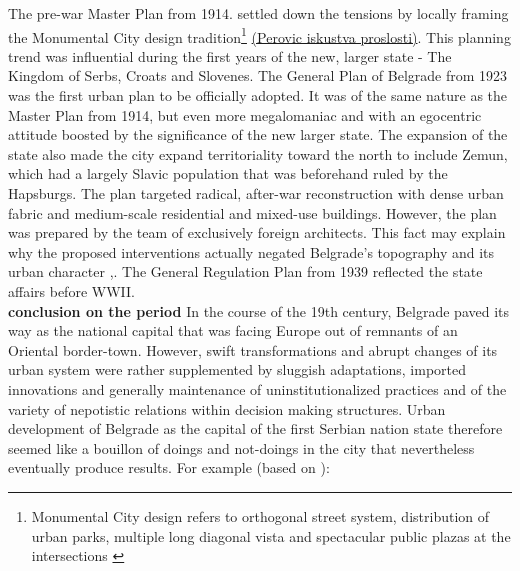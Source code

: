 \documentclass[11pt]{report}
\begin{document}
The pre-war Master Plan from 1914. settled down the tensions by locally framing the Monumental City design tradition\footnote{Monumental City design refers to orthogonal street system, distribution of urban parks, multiple long diagonal vista and spectacular public plazas at the intersections \href{ref}{\citealt{hirt_belgrade_2009}}} \href{ref}{(Perovic iskustva proslosti)}.
This planning trend was influential during the first years of the new, larger state - The Kingdom of Serbs, Croats and Slovenes.
The  General  Plan  of  Belgrade  from  1923 was the first urban plan to be officially adopted.
It was of the same nature as the Master Plan from 1914, but even more megalomaniac and with an egocentric attitude boosted by the significance of the new larger state.
The expansion of the state also made the city expand territoriality toward the north to include Zemun, which had a largely Slavic population that was beforehand ruled by the Hapsburgs.
The plan targeted radical, after-war reconstruction with dense urban fabric and medium-scale residential and mixed-use buildings.
However, the plan was prepared by the team of exclusively foreign architects. This fact may explain why the proposed interventions actually negated Belgrade’s  topography  and  its  urban  character \href{ref}{\citealt{grozdanic_belgrade_2008}},\href{ref}{\citealt{blagojevic_urban_2009}}.
The General Regulation Plan from 1939 reflected the state  affairs before WWII.
\\

\textbf{conclusion on the period}
In the course of the 19th century, Belgrade paved its way as the national capital that was facing Europe out of remnants of an Oriental border-town.
However, swift transformations and abrupt changes of its urban system were rather supplemented by sluggish adaptations, imported innovations and generally maintenance of uninstitutionalized practices and of the variety of nepotistic relations within decision making structures.
Urban development of Belgrade as the capital of the first Serbian nation state therefore seemed like a bouillon of doings and not-doings in the city that nevertheless eventually produce results. For example (based on \href{ref}{\citealt{dubravka_stojanovic_kontroverze_2015}}):
\end{document}

